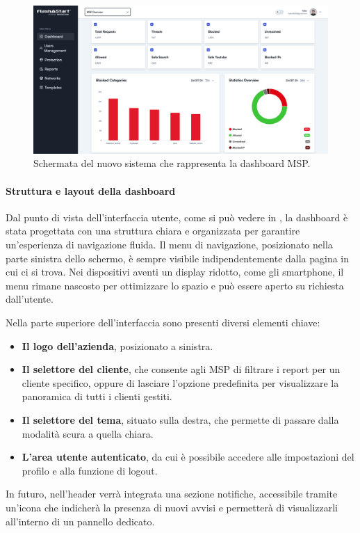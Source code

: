 \begin{figure}
  \centering
  \includegraphics[width=1\textwidth]{figures/new-dashboard.png}
  \caption{Schermata del nuovo sistema che rappresenta la dashboard MSP.}
  \label{fig:dashboard-msp}
\end{figure}

\paragraph{Struttura e layout della dashboard}
Dal punto di vista dell’interfaccia utente, come si può vedere in , la dashboard è stata progettata con una struttura chiara e organizzata per garantire un’esperienza di navigazione fluida. Il menu di navigazione, posizionato nella parte sinistra dello schermo, è sempre visibile indipendentemente dalla pagina in cui ci si trova. Nei dispositivi aventi un display ridotto, come gli smartphone, il menu rimane nascosto per ottimizzare lo spazio e può essere aperto su richiesta dall’utente.

Nella parte superiore dell’interfaccia sono presenti diversi elementi chiave:
\begin{itemize}
  \item \textbf{Il logo dell'azienda}, posizionato a sinistra.
  \item \textbf{Il selettore del cliente}, che consente agli MSP di filtrare i report per un cliente specifico, oppure di lasciare l’opzione predefinita per visualizzare la panoramica di tutti i clienti gestiti.
  \item \textbf{Il selettore del tema}, situato sulla destra, che permette di passare dalla modalità scura a quella chiara.
  \item \textbf{L’area utente autenticato}, da cui è possibile accedere alle impostazioni del profilo e alla funzione di logout.
\end{itemize}
%
In futuro, nell’header verrà integrata una sezione notifiche, accessibile tramite un’icona che indicherà la presenza di nuovi avvisi e permetterà di visualizzarli all’interno di un pannello dedicato.

